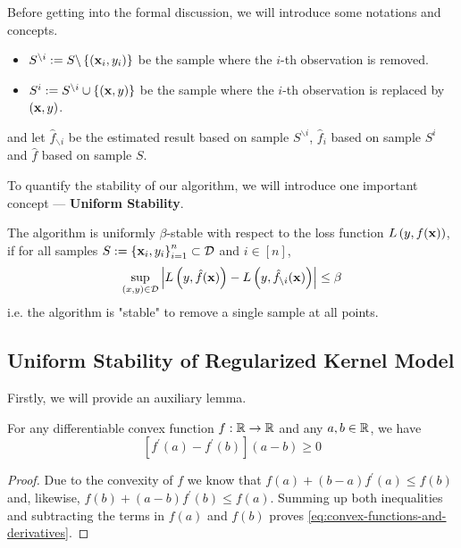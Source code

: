 \noindent Before getting into the formal discussion, we will introduce some notations and concepts.
\begin{itemize}
	\item $S^{\backslash i}:=S\backslash\left\{({\bf x}_{i},y_{i})\right\}$ be the sample where the $i$-th observation is removed.
	\item $S^{i}:=S^{\backslash i}\cup\{({\bf x},y)\}$ be the sample where the $i$-th observation is replaced by $({\bf x},y)$.
\end{itemize}
and let $\hat{f}_{\backslash i}$ be the estimated result based on sample $S^{\backslash i}$, $\hat{f}_{i}$ based on sample $S^{i}$ and $\hat{f}$ based on sample $S$.

To quantify the stability of our algorithm, we will introduce one important concept --- \textbf{Uniform Stability}.
\begin{definition}
	\label{def:uniform-stability}
	The algorithm is uniformly $\beta$-stable with respect to the loss function $L\left(y,f({\bf x})\right)$, if for all samples $S:=\left\{{\bf x}_{i},y_{i}\right\}_{i=1}^{n}\subset\mathcal{D}$ and $i\in[n]$,
	\begin{equation}
		\sup_{(x,y)\in\mathcal{D}}\left|L\left(y,\hat{f}({\bf x})\right)-L\left(y,\hat{f}_{\backslash i}({\bf x})\right)\right|\leq\beta
	\end{equation}
	i.e. the algorithm is "stable" to remove a single sample at all points.
\end{definition}

\subsection{Uniform Stability of Regularized Kernel Model}

Firstly, we will provide an auxiliary lemma.

\begin{lemma} \label{lem:convex-functions-and-derivatives}
	For any differentiable convex function $f:{\mathbb R}\rightarrow{\mathbb R}$ and any $a,b\in{\mathbb R}$, we have
	\begin{equation}
		\label{eq:convex-functions-and-derivatives}
		\left[f^{\prime}(a)-f^{\prime}(b)\right](a-b)\geq 0
	\end{equation}
\end{lemma}

\begin{proof}
	Due to the convexity of $f$ we know that $f(a)+(b-a) f^{\prime}(a) \leq f(b)$ and, likewise, $f(b)+(a-b) f^{\prime}(b) \leq f(a)$. Summing up both inequalities and subtracting the terms in $f(a)$ and $f(b)$ proves \eqref{eq:convex-functions-and-derivatives}.
\end{proof}

